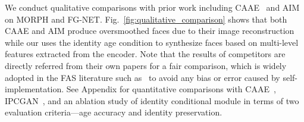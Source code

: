 We conduct qualitative comparisons with prior work including CAAE~\cite{zhang2017age} and AIM~\cite{zhao2019look} on MORPH and FG-NET. Fig.~\ref{fig:qualitative_comparison} shows that both CAAE and AIM produce oversmoothed faces due to their image reconstruction while our \methodname uses the identity age condition to synthesize faces based on multi-level features extracted from the encoder. Note that the results of competitors are directly referred from their own papers for a fair comparison, which is widely adopted in the FAS literature such as~\cite{he2019s2gan,lihierarchical,li2019age,liu2019attribute,yang2018learning} to avoid any bias or error caused by self-implementation. 
See Appendix for quantitative comparisons with CAAE~\cite{zhang2017age}, IPCGAN~\cite{wang2018face}, and an ablation study of identity conditional module in terms of two evaluation criteria---age accuracy and identity preservation.